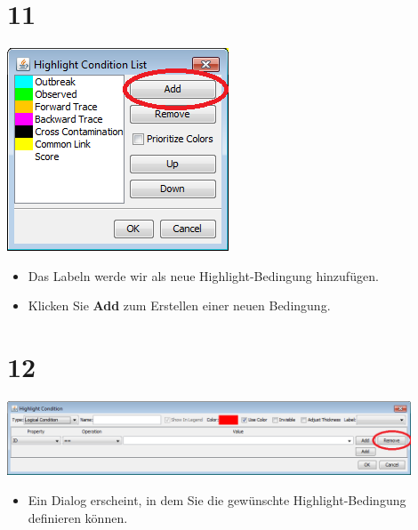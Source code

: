 \documentclass{beamer}
\begin{document}
\section{11}
\begin{frame}
	\begin{center}
  		\includegraphics[height=0.6\textheight]{11.png}
	\end{center}
	\begin{itemize}
		\item Das Labeln werde wir als neue Highlight-Bedingung hinzufügen.
		\item Klicken Sie \textbf{Add} zum Erstellen einer neuen Bedingung.
	\end{itemize}
\end{frame}

\section{12}
\begin{frame}
	\begin{center}
  		\includegraphics[width=0.9\textwidth]{12.png}
	\end{center}
	\begin{itemize}
		\item Ein Dialog erscheint, in dem Sie die gewünschte Highlight-Bedingung definieren können.
	\end{itemize}
\end{frame}
\end{document}
